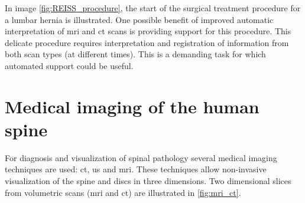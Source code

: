 \par{
    In image \ref{fig:REISS_procedure}, the start of the surgical treatment procedure for a lumbar hernia is illustrated.
    One possible benefit of improved automatic interpretation of \acrshort{mri} and \acrshort{ct} scans is providing support for this procedure.
    This delicate procedure requires interpretation and registration of information from both scan types (at different times). 
    This is a demanding task for which automated support could be useful.
}

\section{Medical imaging of the human spine\label{sec:medical_imaging}}
\par{
    For diagnosis and visualization of spinal pathology several medical imaging techniques are used: \acrfull{ct}, \acrfull{us} and \acrfull{mri}. 
    These techniques allow non-invasive visualization of the spine and discs in three dimensions.
    Two dimensional slices from volumetric scans (\acrshort{mri} and \acrshort{ct}) are illustrated in \ref{fig:mri_ct}.
}
\newpage
